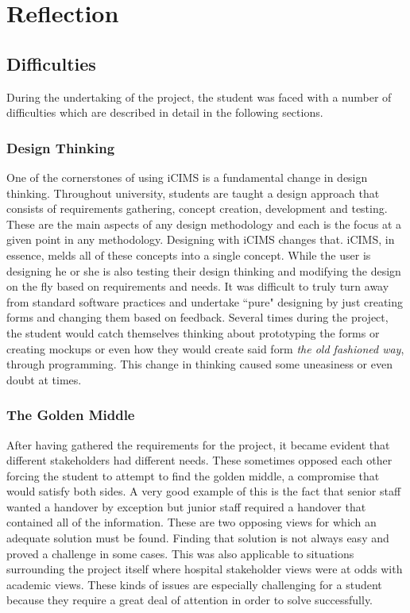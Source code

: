 \section{Reflection}

\subsection{Difficulties}
\label{Difficulties}
During the undertaking of the project, the student was faced with a number of difficulties which are described in detail in the following sections.

\subsubsection{Design Thinking}
One of the cornerstones of using iCIMS is a fundamental change in design thinking. Throughout university, students are taught a design approach that consists of requirements gathering, concept creation, development and testing. These are the main aspects of any design methodology and each is the focus at a given point in any methodology. Designing with iCIMS changes that. iCIMS, in essence, melds all of these concepts into a single concept. While the user is designing he or she is also testing their design thinking and modifying the design on the fly based on requirements and needs. It was difficult to truly turn away from standard software practices and undertake ``pure" designing by just creating forms and changing them based on feedback. Several times during the project, the student would catch themselves thinking about prototyping the forms or creating mockups or even how they would create said form \emph{the old fashioned way}, through programming. This change in thinking caused some uneasiness or even doubt at times. 

\subsubsection{The Golden Middle}
After having gathered the requirements for the project, it became evident that different stakeholders had different needs. These sometimes opposed each other forcing the student to attempt to find the golden middle, a compromise that would satisfy both sides. A very good example of this is the fact that senior staff wanted a handover by exception but junior staff required a handover that contained all of the information. These are two opposing views for which an adequate solution must be found. Finding that solution is not always easy and proved a challenge in some cases. This was also applicable to situations surrounding the project itself where hospital stakeholder views were at odds with academic views. These kinds of issues are especially challenging for a student because they require  a great deal of attention in order to solve successfully.

